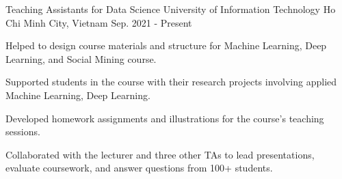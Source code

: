 

\begin{cventries}

  \cventry
    {Teaching Assistants for Data Science} %
    {University of Information Technology} %
    {Ho Chi Minh City, Vietnam} %
    {Sep. 2021 - Present} %
    {
      \begin{cvitems} %
        \item {Helped to design course materials and structure for Machine Learning, Deep Learning, and Social Mining course.}
        \item {Supported students in the course with their research projects involving applied Machine Learning, Deep Learning.}
        \item {Developed homework assignments and illustrations for the course's teaching sessions.}
        \item {Collaborated with the lecturer and three other TAs to lead presentations, evaluate coursework, and answer questions from 100+ students.}
      \end{cvitems}
    }
    

\end{cventries}
